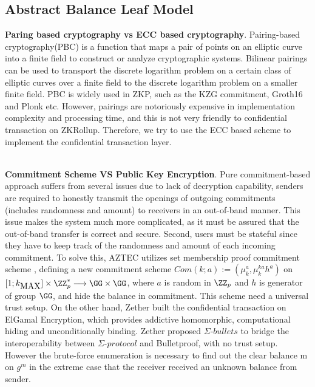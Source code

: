 \documentclass{article}
\begin{document}
\subsection{Abstract Balance Leaf Model} \label{section:abl}

\textbf{Paring based cryptography vs ECC based cryptography}.  Pairing-based cryptography(PBC) is a function that maps a pair of points on an elliptic curve into a finite field to construct or analyze cryptographic systems. Bilinear pairings can be used to transport the discrete logarithm problem on a certain class of elliptic curves over a finite field to the discrete logarithm problem on a smaller finite field. PBC is widely used in ZKP, such as the KZG commitment, Groth16 and Plonk etc. However, pairings are notoriously expensive in implementation complexity and processing time, and this is not very friendly to confidential transaction on ZKRollup. Therefore, we try to use the ECC based scheme to implement the confidential transaction layer.

~\\
\noindent\noindent\textbf{Commitment Scheme VS Public Key Encryption}. Pure commitment-based approach suffers from several issues due to lack of decryption capability, senders are required to honestly transmit the openings of outgoing commitments (includes randomness and amount) to receivers in an out-of-band manner. This issue makes the system much more complicated, as it must be assured that the out-of-band transfer is correct and secure. Second, users must be stateful since they have to keep track of the randomness and amount of each incoming commitment. To solve this, AZTEC utilizes set membership proof commitment scheme \cite{camenisch2008efficient,arfaoui2015practical}, defining a new commitment scheme $ Com(k; a) := (\mu_k^a, \mu_k^{ka}h^a)$ on $[1; k_{\mbox{MAX}}] \times \ZZ_p^{*} \longrightarrow \GG \times \GG$, where $a$ is random in $\ZZ_p$ and $h$ is generator of group $\GG$, and hide the balance in commitment. This scheme need a universal trust setup.  On the other hand,  Zether built the confidential transaction on ElGamal Encryption\cite{elgamal1985public}, which provides addictive homomorphic, computational hiding and unconditionally binding. Zether proposed $\Sigma\mbox{-}bullets$ to bridge the interoperability between $\Sigma\mbox{-}protocol$ and Bulletproof\cite{bunz2018bulletproofs}, with no trust setup. However the brute-force enumeration is necessary to find out the clear balance m on $g^m$ in the extreme case that the receiver received an unknown balance from sender.
\end{document}
